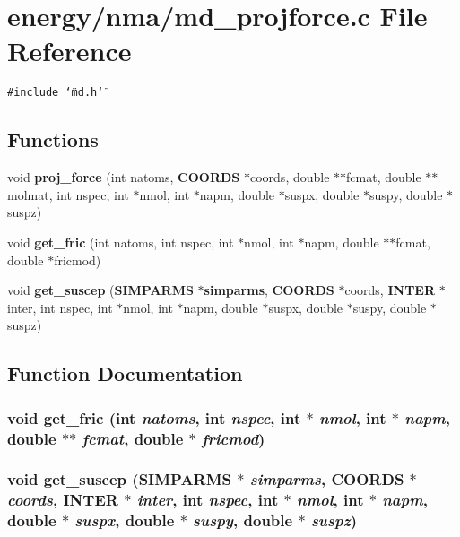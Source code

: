\section{energy/nma/md\_\-projforce.c File Reference}
\label{nma_2md__projforce_8c}
{\tt \#include \char`\"{}md.h\char`\"{}}\par
\subsection*{Functions}
\begin{CompactItemize}
\item 
void {\bf proj\_\-force} (int natoms, {\bf COORDS} $\ast$coords, double $\ast$$\ast$fcmat, double $\ast$$\ast$molmat, int nspec, int $\ast$nmol, int $\ast$napm, double $\ast$suspx, double $\ast$suspy, double $\ast$suspz)
\item 
void {\bf get\_\-fric} (int natoms, int nspec, int $\ast$nmol, int $\ast$napm, double $\ast$$\ast$fcmat, double $\ast$fricmod)
\item 
void {\bf get\_\-suscep} ({\bf SIMPARMS} $\ast${\bf simparms}, {\bf COORDS} $\ast$coords, {\bf INTER} $\ast$inter, int nspec, int $\ast$nmol, int $\ast$napm, double $\ast$suspx, double $\ast$suspy, double $\ast$suspz)
\end{CompactItemize}


\subsection{Function Documentation}
\subsubsection{\setlength{\rightskip}{0pt plus 5cm}void get\_\-fric (int {\em natoms}, int {\em nspec}, int $\ast$ {\em nmol}, int $\ast$ {\em napm}, double $\ast$$\ast$ {\em fcmat}, double $\ast$ {\em fricmod})}\label{nma_2md__projforce_8c_33ed24cde634e1414e184606a1f18840}


\subsubsection{\setlength{\rightskip}{0pt plus 5cm}void get\_\-suscep ({\bf SIMPARMS} $\ast$ {\em simparms}, {\bf COORDS} $\ast$ {\em coords}, {\bf INTER} $\ast$ {\em inter}, int {\em nspec}, int $\ast$ {\em nmol}, int $\ast$ {\em napm}, double $\ast$ {\em suspx}, double $\ast$ {\em suspy}, double $\ast$ {\em suspz})}\label{nma_2md__projforce_8c_9cdae3e62f004d3ad244c1e68d5770ff}



